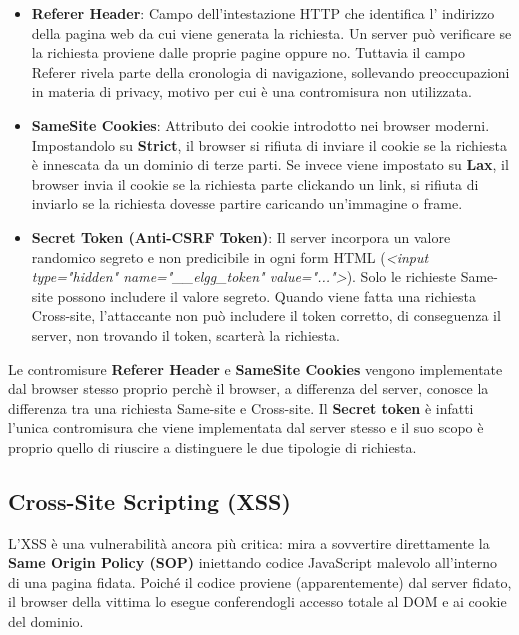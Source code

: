 \begin{itemize}
    \item \textbf{Referer Header}: Campo dell'intestazione HTTP che identifica l'
    indirizzo della pagina web da cui viene generata la richiesta. Un server può verificare se la
    richiesta proviene dalle proprie pagine oppure no. Tuttavia il campo Referer
    rivela parte della cronologia di navigazione, sollevando preoccupazioni
    in materia di privacy, motivo per cui è una contromisura non utilizzata.
    \item \textbf{SameSite Cookies}: Attributo dei cookie introdotto nei 
    browser moderni. Impostandolo su \textbf{Strict}, il browser si rifiuta di 
    inviare il cookie se la richiesta è innescata da un dominio di terze 
    parti. Se invece viene impostato su \textbf{Lax}, il browser invia il 
    cookie se la richiesta parte clickando un link, si rifiuta di inviarlo
    se la richiesta dovesse partire caricando un'immagine o frame.
    \item \textbf{Secret Token (Anti-CSRF Token)}: Il server incorpora un 
    valore randomico segreto e non predicibile in ogni form HTML (\textit{<input 
    type="hidden" name="\_\_elgg\_token" value="...">}). 
    Solo le richieste Same-site possono includere il valore segreto.
    Quando viene fatta una richiesta Cross-site, l'attaccante non può includere il token corretto,
    di conseguenza il server, non trovando il token, scarterà la richiesta.
\end{itemize}

Le contromisure \textbf{Referer Header} e \textbf{SameSite Cookies} vengono implementate dal
browser stesso proprio perchè il browser, a differenza del server, conosce
la differenza tra una richiesta Same-site e Cross-site. Il \textbf{Secret token} è
infatti l'unica contromisura che viene implementata dal server stesso e il
suo scopo è proprio quello di riuscire a distinguere le due tipologie di richiesta.

\subsection{Cross-Site Scripting (XSS)}

L'XSS è una vulnerabilità ancora più critica: mira a sovvertire direttamente 
la \textbf{Same Origin Policy (SOP)} iniettando codice JavaScript malevolo all'interno 
di una pagina fidata. Poiché il codice proviene (apparentemente) dal server 
fidato, il browser della vittima lo esegue conferendogli accesso totale al 
DOM e ai cookie del dominio.

